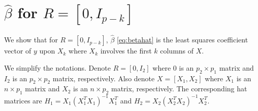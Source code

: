 \iffalse
\section{\texorpdfstring{$\hat{\beta}$}{} for \texorpdfstring{$R=[0, I_{p-k}]$}{} }
We show that for $R=[0, I_{p-k}]$, $\hat{\beta}$ \eqref{eq:betahat} is the least squares coefficient vector of $y$ upon $X_k$ where $X_k$ involves the first $k$ columns of $X$. 

We simplify the notations. Denote $R=[0, I_2]$ where $0$ is an $p_2 \times p_1$ matrix and $I_2$ is an $p_2 \times p_2$ matrix, respectively. Also denote $X=[X_1, X_2]$ where $X_1$ is an $n \times p_1$ matrix and $X_2$ is an $n \times p_2$ matrix, respectively. The corresponding hat matrices are $H_1 = X_1 (X_1^T X_1)^{-1} X_1^T$ and $H_2 = X_2 (X_2^T X_2)^{-1} X_2^T$. 


